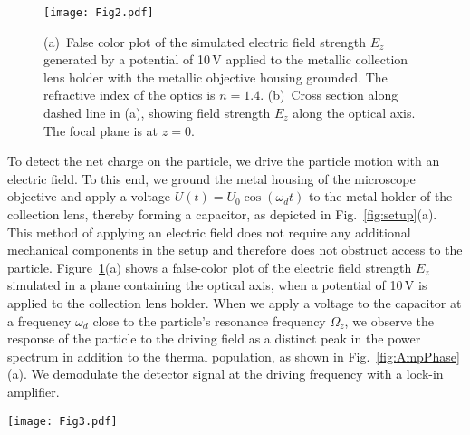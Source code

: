 \documentclass[aps,amssymb,amsmath,pra,reprint,noshowpacs]{revtex4-1}
\newcommand{\figwidth}{0.9\columnwidth} %
\begin{document}
\begin{figure}
\texttt{[image: Fig2.pdf]}
\caption{(a)~False color plot of the simulated electric field strength $E_z$ generated by a potential of 10\,V applied to the metallic collection lens holder with the metallic objective housing grounded. The refractive index of the optics is $n=1.4$. (b)~Cross section along dashed line in (a), showing field strength $E_z$ along the optical axis. The focal plane is at $z=0$.
}
\label{fig:fieldSim}
\end{figure}

To detect the net charge on the particle, we drive the particle motion with an electric field. To this end, we ground the metal housing of the microscope objective and apply a voltage $U(t)=U_0\cos(\omega_d t)$ to the metal holder of the collection lens, thereby forming a capacitor, as depicted in Fig.~\ref{fig:setup}(a). This method of applying an electric field does not require any additional mechanical components in the setup and therefore does not obstruct access to the particle. Figure~\ref{fig:fieldSim}(a) shows a false-color plot of the electric field strength $E_z$ simulated in a plane containing the optical axis, when a potential of 10\,V is applied to the collection lens holder. When we apply a voltage to the capacitor at a frequency $\omega_d$ close to the particle's resonance frequency $\Omega_z$, we observe the response of the particle to the driving field as a distinct peak in the power spectrum in addition to the thermal population, as shown in Fig.~\ref{fig:AmpPhase}(a). We demodulate the detector signal at the driving frequency with a lock-in amplifier.

\begin{figure*}
\texttt{[image: Fig3.pdf]}
\caption{(a)~{Power spectral density $S_z$ of the motion along the optical axis of a charge-carrying particle at a pressure of 1.9\,mbar in the presence of a drive tone at $f_d=\omega_d/(2\pi)$ applied to the capacitor.} The solid line is a Lorentzian function fit to the data. (b)~Quadrature component of particle oscillation in response to a driving voltage $U_0=10$\,V, demodulated in a bandwidth of 7\,Hz. The high-voltage (HV) discharge is turned on at $t=0$. The oscillation amplitude changes in discrete steps while the high-voltage is on. (c)~Preparation of charge state. The high-voltage is turned off at $t=0$, while the particle carries a net charge of $1e$. The charge stays constant over the remainder of the measurement.}
\label{fig:AmpPhase}
\end{figure*}
\end{document}

